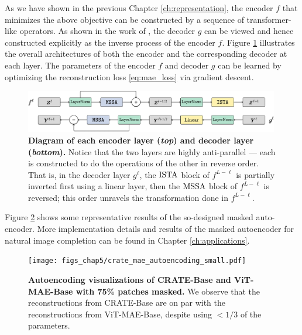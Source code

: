 \documentclass[../../book-main.tex]{subfiles}
\begin{document}
As we have shown in the previous Chapter \ref{ch:representation}, the
encoder $f$ that minimizes the above objective can be constructed by
a sequence of transformer-like operators. As shown in the work of
\cite{Pai2024masked}, the decoder $g$ can be viewed and hence
constructed explicitly as the inverse process of the encoder $f$.
Figure \ref{fig:crate_mae_layers} illustrates the overall
architectures of both the encoder and the corresponding decoder at
each layer. The parameters of the encoder $f$ and decoder $g$ can be
learned by optimizing the reconstruction loss \eqref{eq:mae_loss} via
gradient descent.

\begin{figure}[t!]
\centering
\includegraphics[width=0.99\textwidth]{figs_chap5/crate_mae_layers.png}
\caption{\small \textbf{Diagram of each encoder layer
  (\textit{top}) and decoder layer (\textit{bottom}).} Notice that
  the two layers are highly anti-parallel --- each is constructed to
  do the operations of the other in reverse order. That is, in the
  decoder layer \(g^{\ell}\), the \(\operatorname{ISTA}\) block of \(f^{L - \ell}\)
  is partially inverted first using a linear layer, then the
  \(\operatorname{MSSA}\) block of \(f^{L - \ell}\) is reversed; this order
unravels the transformation done in \(f^{L - \ell}\).}
\label{fig:crate_mae_layers}
\end{figure}

Figure \ref{fig:mae_autoencoding-small} shows some representative
results of the so-designed masked auto-encoder. More implementation details and
results of the masked autoencoder for natural image completion can be
found in Chapter \ref{ch:applications}.
\begin{figure}[t]
\centering
\texttt{[image: figs\_chap5/crate\_mae\_autoencoding\_small.pdf]}
\caption{\small \textbf{Autoencoding visualizations of CRATE-Base
  and ViT-MAE-Base \cite{he2022masked} with 75\% patches masked.}
  We observe that the reconstructions from CRATE-Base are on par
  with the reconstructions from ViT-MAE-Base, despite using \(<
  1/3\) of the parameters.
}
\label{fig:mae_autoencoding-small}
\end{figure}
\end{document}

